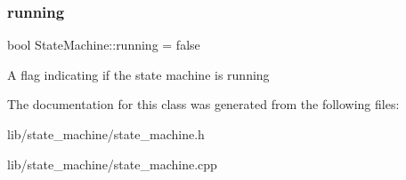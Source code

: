 \subsubsection{\texorpdfstring{running}{running}}
{\footnotesize\ttfamily bool State\+Machine\+::running = false\hspace{0.3cm}{\ttfamily [private]}}

A flag indicating if the state machine is running 

The documentation for this class was generated from the following files\+:\begin{DoxyCompactItemize}
\item 
lib/state\+\_\+machine/state\+\_\+machine.\+h\item 
lib/state\+\_\+machine/state\+\_\+machine.\+cpp\end{DoxyCompactItemize}
